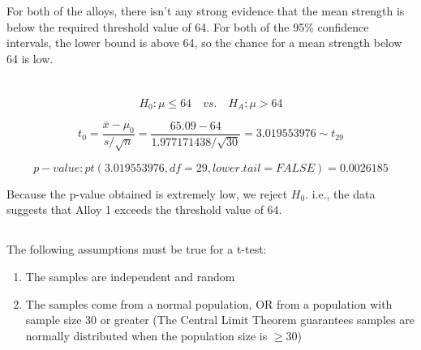 \documentclass[letterpaper]{article}
\begin{document}
For both of the alloys, there isn't any strong evidence that the mean strength
is below the required threshold value of 64. For both of the 95\% confidence
intervals, the lower bound is above 64, so the chance for a mean strength below
64 is low.

\section{}%
\subsection{}%
%
$$H_0: \mu \leq 64 \quad vs. \quad H_A: \mu > 64 $$

$$t_0 = \frac{\bar{x}-\mu_0}{s/\sqrt{n}} = \frac{65.09 - 64}{1.977171438/\sqrt{30}} =  3.019553976 \sim t_{29}$$

$$ {p-value}: pt(3.019553976, df=29, lower.tail=FALSE) = 0.0026185 $$

Because the p-value obtained is extremely low, we reject $H_0$.
i.e., the data suggests that Alloy 1 exceeds the threshold value of 64.


\subsection{}%
%
The following assumptions must be true for a t-test:
\begin{enumerate}
 \item The samples are independent and random
 \item The samples come from a normal population,
       OR from a population with sample size 30 or greater
       (The Central Limit Theorem guarantees samples are normally distributed
       when the population size is $\geq 30$)
\end{enumerate}
\end{document}
